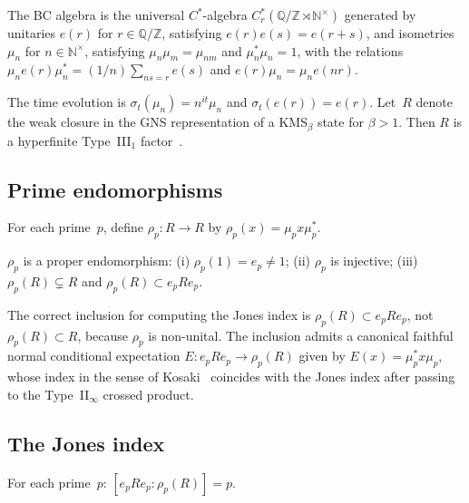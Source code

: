 \documentclass[aps,prl,twocolumn,superscriptaddress,showpacs]{revtex4-2}
\begin{document}
The BC algebra is the universal $C^*$-algebra $C^*_r(\mathbb{Q}/\mathbb{Z} \rtimes \mathbb{N}^\times)$ generated by unitaries $e(r)$ for $r \in \mathbb{Q}/\mathbb{Z}$, satisfying $e(r)e(s)=e(r{+}s)$, and isometries $\mu_n$ for $n \in \mathbb{N}^\times$, satisfying $\mu_n \mu_m = \mu_{nm}$ and $\mu_n^* \mu_n = 1$, with the relations $\mu_n e(r) \mu_n^* = (1/n)\sum_{ns=r} e(s)$ and $e(r)\mu_n = \mu_n e(nr)$.

The time evolution is $\sigma_t(\mu_n) = n^{it}\mu_n$ and $\sigma_t(e(r)) = e(r)$. Let~$R$ denote the weak closure in the GNS representation of a KMS$_\beta$ state for $\beta > 1$. Then $R$ is a hyperfinite Type~III$_1$ factor~\cite{ConnesMarcolli2008}.

\subsection{Prime endomorphisms}

For each prime~$p$, define $\rho_p : R \to R$ by $\rho_p(x) = \mu_p x \mu_p^*$.

\begin{lemma}
$\rho_p$ is a proper endomorphism: (i) $\rho_p(1) = e_p \neq 1$; (ii) $\rho_p$ is injective; (iii) $\rho_p(R) \subsetneq R$ and $\rho_p(R) \subset e_p R e_p$.
\end{lemma}

The correct inclusion for computing the Jones index is $\rho_p(R) \subset e_p R e_p$, not $\rho_p(R) \subset R$, because $\rho_p$ is non-unital. The inclusion admits a canonical faithful normal conditional expectation $E: e_p R e_p \to \rho_p(R)$ given by $E(x) = \mu_p^* x \mu_p$, whose index in the sense of Kosaki~\cite{Kosaki1986} coincides with the Jones index after passing to the Type~II$_\infty$ crossed product.

\subsection{The Jones index}

\begin{theorem}
\label{thm:index}
For each prime~$p$: $[e_p R e_p : \rho_p(R)] = p$.
\end{theorem}
\end{document}
